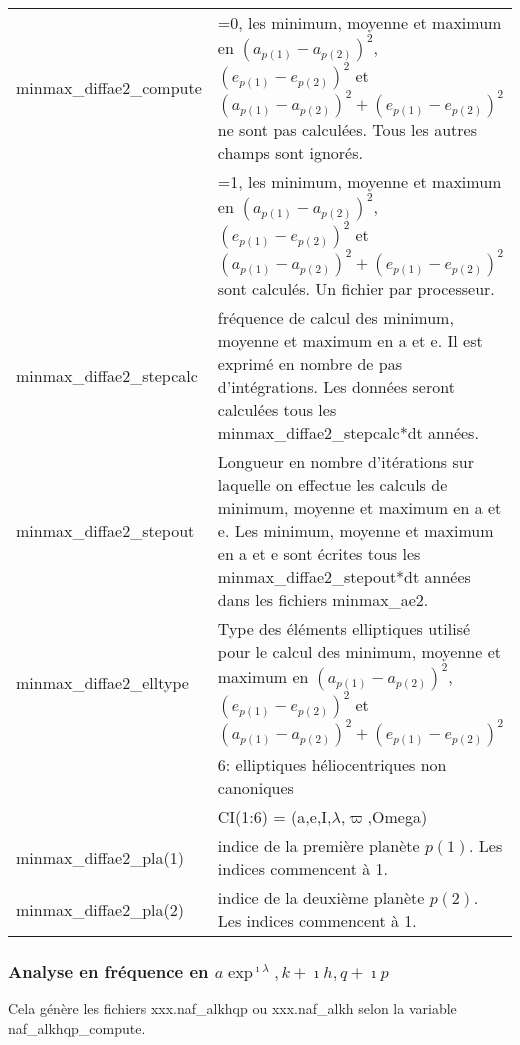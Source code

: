 \documentclass[11pt]{article}
\begin{document}
\begin{tabularx}{\textwidth}{|l|X|}
\hline
minmax\_diffae2\_compute  & =0, les minimum, moyenne et maximum en $(a_{p(1)}-a_{p(2)})^2$, $(e_{p(1)}-e_{p(2)})^2$ et $(a_{p(1)}-a_{p(2)})^2+(e_{p(1)}-e_{p(2)})^2$ ne sont pas calcul\'ees. Tous les autres champs sont ignor\'es.\\
&=1, les minimum, moyenne et maximum en  $(a_{p(1)}-a_{p(2)})^2$, $(e_{p(1)}-e_{p(2)})^2$ et $(a_{p(1)}-a_{p(2)})^2+(e_{p(1)}-e_{p(2)})^2$ sont calcul\'es. Un fichier par processeur.\\ \hline
minmax\_diffae2\_stepcalc   & fr\'equence de calcul des minimum, moyenne et maximum en a et e. Il est exprim\'e en nombre de pas d'int\'egrations. Les donn\'ees seront calcul\'ees tous les minmax\_diffae2\_stepcalc*dt ann\'ees.\\ \hline

minmax\_diffae2\_stepout   &Longueur en nombre d'it\'erations sur laquelle on effectue les calculs de minimum, moyenne et maximum en a et e. Les minimum, moyenne et maximum en a et e sont \'ecrites tous les minmax\_diffae2\_stepout*dt ann\'ees dans les fichiers minmax\_ae2. \\ \hline
minmax\_diffae2\_elltype  & Type des \'el\'ements elliptiques utilis\'e pour le calcul des  minimum, moyenne et maximum en $(a_{p(1)}-a_{p(2)})^2$, $(e_{p(1)}-e_{p(2)})^2$ et $(a_{p(1)}-a_{p(2)})^2+(e_{p(1)}-e_{p(2)})^2$ \\
&6:  elliptiques h\'eliocentriques non canoniques\\
&	     CI(1:6) = (a,e,I,$\lambda$,$\varpi$,Omega)\\ \hline
minmax\_diffae2\_pla(1)   & indice de la premi\`ere plan\`ete $p(1)$. Les indices commencent \`a 1.\\ \hline
minmax\_diffae2\_pla(2)   & indice de la deuxi\`eme plan\`ete $p(2)$. Les indices commencent \`a  1.\\ \hline
 \end{tabularx}

\vspace{0.5cm}
\subsubsection*{Analyse en fr\'equence en $a\exp^{\imath\lambda}, k+\imath h, q+\imath p$}
Cela g\'en\`ere les fichiers xxx.naf\_alkhqp ou xxx.naf\_alkh selon la variable naf\_alkhqp\_compute.
\end{document}
